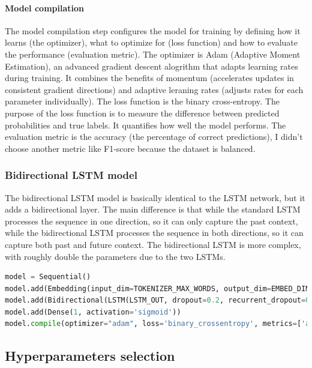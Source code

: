 \documentclass{article}
\begin{document}
\paragraph{Model compilation}
The model compilation step configures the model for training by defining how it learns (the optimizer), what to optimize for (loss function) and how to evaluate the performance (evaluation metric).
The optimizer is Adam (Adaptive Moment Estimation), an advanced gradient descent alogrithm that adapts learning rates during training.
It combines the benefits of momentum (accelerates updates in consistent gradient directions) and adaptive leraning rates (adjusts rates for each parameter individually).
The loss function is the binary cross-entropy.
The purpose of the loss function is to measure the difference between predicted probabilities and true labels.
It quantifies how well the model performs.
The evaluation metric is the accuracy (the percentage of correct predictions), I didn't choose another metric like F1-score because the dataset is balanced.

\subsubsection{Bidirectional LSTM model}

The bidirectional LSTM model is basically identical to the LSTM network, but it adds a bidirectional layer.
The main difference is that while the standard LSTM processes the sequence in one direction, so it can only capture the past context, while the bidirectional LSTM processes the sequence in both directions, so it can capture both past and future context.
The bidirectional LSTM is more complex, with roughly double the parameters due to the two LSTMs.

\begin{lstlisting}[language=python]
model = Sequential()
model.add(Embedding(input_dim=TOKENIZER_MAX_WORDS, output_dim=EMBED_DIM))
model.add(Bidirectional(LSTM(LSTM_OUT, dropout=0.2, recurrent_dropout=0.2)))
model.add(Dense(1, activation='sigmoid'))
model.compile(optimizer="adam", loss='binary_crossentropy', metrics=['accuracy'])
\end{lstlisting}

\subsection{Hyperparameters selection}
\label{sec:hyperparameters}
\end{document}
